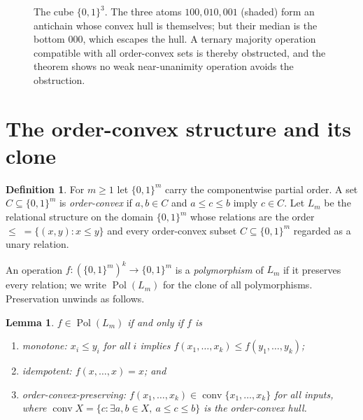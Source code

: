 \documentclass[11pt]{amsart}
\theoremstyle{plain}
\newtheorem{lem}[thm]{Lemma}
\theoremstyle{definition}
\newtheorem{defn}[thm]{Definition}
\DeclareMathOperator{\conv}{conv}
\DeclareMathOperator{\Pol}{Pol}
\newcommand{\B}{\{0,1\}}
\newcommand{\med}{\mathrm{med}}
\begin{document}
\begin{figure}[ht]
\centering
{}
\caption{The cube $\B^3$.  The three atoms $100,010,001$ (shaded) form an
antichain whose convex hull is themselves; but their median is the
bottom $000$, which escapes the hull.  A ternary majority operation
compatible with all order-convex sets is thereby obstructed, and the
theorem shows no weak near-unanimity operation avoids the obstruction.}
\label{fig:cube}
\end{figure}

\section{The order-convex structure and its clone}

\begin{defn}
  For $m\ge 1$ let $\B^m$ carry the componentwise partial order.  A set
  $C\subseteq\B^m$ is \emph{order-convex} if $a,b\in C$ and $a\le c\le
  b$ imply $c\in C$.  Let $L_m$ be the relational structure on the
  domain $\B^m$ whose relations are the order
  $\le\;=\{(x,y):x\le y\}$ and every order-convex subset $C\subseteq
  \B^m$ regarded as a unary relation.
\end{defn}

An operation $f\colon(\B^m)^k\to\B^m$ is a \emph{polymorphism} of $L_m$
if it preserves every relation; we write $\Pol(L_m)$ for the clone of
all polymorphisms.  Preservation unwinds as follows.

\begin{lem}\label{lem:polchar}
  $f\in\Pol(L_m)$ if and only if $f$ is
  \begin{enumerate}
  \item \emph{monotone}: $x_i\le y_i$ for all $i$ implies
    $f(x_1,\dots,x_k)\le f(y_1,\dots,y_k)$;
  \item \emph{idempotent}: $f(x,\dots,x)=x$; and
  \item \emph{order-convex-preserving}:
    $f(x_1,\dots,x_k)\in\conv\{x_1,\dots,x_k\}$ for all inputs, where
    $\conv X=\{c:\exists a,b\in X,\ a\le c\le b\}$ is the order-convex
    hull.
  \end{enumerate}
\end{lem}
\end{document}
